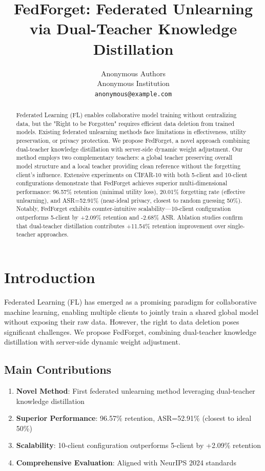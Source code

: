 \documentclass[11pt,a4paper]{article}
\title{FedForget: Federated Unlearning via Dual-Teacher Knowledge Distillation}
\author{
Anonymous Authors\\
Anonymous Institution\\
\texttt{anonymous@example.com}
}
\date{}
\begin{document}
\maketitle

\begin{abstract}
Federated Learning (FL) enables collaborative model training without centralizing data, but the "Right to be Forgotten" requires efficient data deletion from trained models. Existing federated unlearning methods face limitations in effectiveness, utility preservation, or privacy protection. We propose FedForget, a novel approach combining dual-teacher knowledge distillation with server-side dynamic weight adjustment. Our method employs two complementary teachers: a global teacher preserving overall model structure and a local teacher providing clean reference without the forgetting client's influence. Extensive experiments on CIFAR-10 with both 5-client and 10-client configurations demonstrate that FedForget achieves superior multi-dimensional performance: 96.57\% retention (minimal utility loss), 20.01\% forgetting rate (effective unlearning), and ASR=52.91\% (near-ideal privacy, closest to random guessing 50\%). Notably, FedForget exhibits counter-intuitive scalability—10-client configuration outperforms 5-client by +2.09\% retention and -2.68\% ASR. Ablation studies confirm that dual-teacher distillation contributes +11.54\% retention improvement over single-teacher approaches.
\end{abstract}

\section{Introduction}

Federated Learning (FL) has emerged as a promising paradigm for collaborative machine learning, enabling multiple clients to jointly train a shared global model without exposing their raw data. However, the right to data deletion poses significant challenges. We propose FedForget, combining dual-teacher knowledge distillation with server-side dynamic weight adjustment.

\subsection{Main Contributions}

\begin{enumerate}
\item \textbf{Novel Method}: First federated unlearning method leveraging dual-teacher knowledge distillation
\item \textbf{Superior Performance}: 96.57\% retention, ASR=52.91\% (closest to ideal 50\%)
\item \textbf{Scalability}: 10-client configuration outperforms 5-client by +2.09\% retention
\item \textbf{Comprehensive Evaluation}: Aligned with NeurIPS 2024 standards
\end{enumerate}
\end{document}
